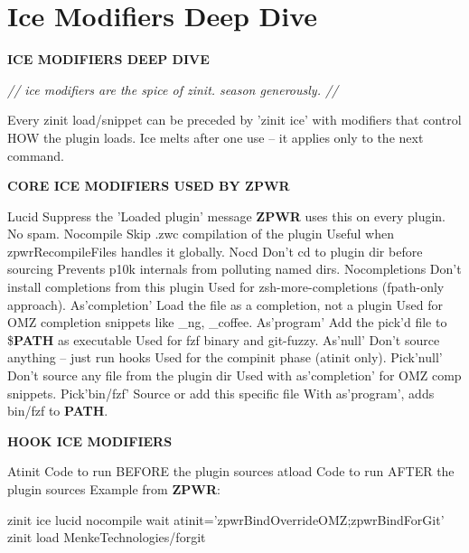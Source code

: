 \documentclass[11pt,a4paper,twoside]{book}
\begin{document}
\vspace{16pt}

\section{Ice Modifiers Deep Dive}


\vspace{10pt}
{\large\bfseries\color{neoncyan} ICE MODIFIERS DEEP DIVE}\vspace{6pt}

{\small\itshape\color{dimtext} // ice modifiers are the spice of zinit. season generously. //}

Every zinit load/snippet can be preceded by 'zinit ice' with modifiers that control HOW the plugin loads. Ice melts after one use -- it applies only to the next command.


\vspace{12pt}
{\bfseries\color{neonyellow} CORE ICE MODIFIERS USED BY \textbf{ZPWR}}\vspace{4pt}

Lucid          Suppress the 'Loaded plugin' message \textbf{ZPWR} uses this on every plugin. No spam. Nocompile      Skip .zwc compilation of the plugin Useful when zpwrRecompileFiles handles it globally. Nocd           Don't cd to plugin dir before sourcing Prevents p10k internals from polluting named dirs. Nocompletions  Don't install completions from this plugin Used for zsh-more-completions (fpath-only approach). As'completion' Load the file as a completion, not a plugin Used for OMZ completion snippets like \_ng, \_coffee. As'program'    Add the pick'd file to \$\textbf{PATH} as executable Used for fzf binary and git-fuzzy. As'null'       Don't source anything -- just run hooks Used for the compinit phase (atinit only). Pick'null'     Don't source any file from the plugin dir Used with as'completion' for OMZ comp snippets. Pick'bin/fzf'  Source or add this specific file With as'program', adds bin/fzf to \textbf{PATH}.


\vspace{12pt}
{\bfseries\color{neonyellow} HOOK ICE MODIFIERS}\vspace{4pt}

Atinit         Code to run BEFORE the plugin sources atload         Code to run AFTER the plugin sources Example from \textbf{ZPWR}:

\begin{codebox}
\color{neongreen}zinit ice lucid nocompile wait atinit='zpwrBindOverrideOMZ;zpwrBindForGit'\\
\color{neongreen}zinit load MenkeTechnologies/forgit\\
\end{codebox}
\end{document}
